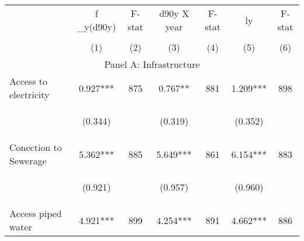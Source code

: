 \begin{tabular}{lcccccc}


\toprule


\multicolumn{1}{l}{} & \multicolumn{1}{c}{f \_y(d90y)} & \multicolumn{1}{c}{F-stat} & \multicolumn{1}{c}{d90y X year} & \multicolumn{1}{c}{F-stat} & \multicolumn{1}{c}{ly} & \multicolumn{1}{c}{F-stat}  \\

\cmidrule(l{1mm}r{1mm}){2-3} \cmidrule(l{1mm}r{1mm}){4-5} \cmidrule(l{1mm}r{1mm}){6-7}   \\

 & (1) & (2) & (3) & (4) & (5) & (6)  \\ 
 

\hline

\multicolumn{7}{c}{Panel A: Infrastructure}   \\                                                          

Access to electricity   &  0.927***   &  875  &   0.767**  &  881 &  1.209***  &  898 \\

\vspace{4pt} &  \begin{footnotesize}(0.344)\end{footnotesize}   & &
			    \begin{footnotesize}(0.319)\end{footnotesize}   & &
			    \begin{footnotesize}(0.352)\end{footnotesize}   & 
			     \\          


Conection to Sewerage   &  5.362***   &  885  &   5.649***  &  861 &  6.154***  &  883   \\

\vspace{4pt} &  \begin{footnotesize}(0.921)\end{footnotesize}   & &
			    \begin{footnotesize}(0.957)\end{footnotesize}   & &
			    \begin{footnotesize}(0.960)\end{footnotesize}   &
			     \\          


Access piped water   &  4.921***   &  899  &   4.254***  &  891 &  4.662***  &  886   \\



\end{tabular}
